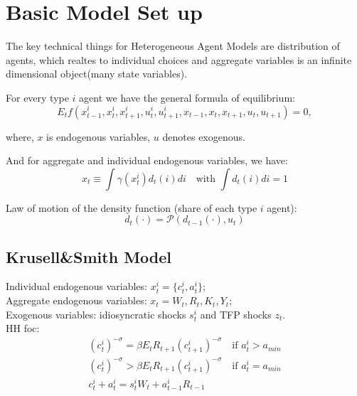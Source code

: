 
% 



\section{Basic Model Set up}

The key technical things for Heterogeneous Agent Models are distribution of agents, which realtes to individual choices and aggregate variables is an {\color{red} infinite dimensional object}(many state variables). 

For every type $i$ agent we have the general formula of equilibrium: 
\[ 
E_t f(x^i_{t-1}, x^i_{t}, x^i_{t+1},u^i_{t},u^i_{t+1},x_{t-1}, x_{t}, x_{t+1},u_{t},u_{t+1})=0, 
\]


where, $x$ is endogenous variables, $u$ denotes exogenous. 

And for aggregate and individual endogenous variables, we have: 
\[
x_t \equiv \int \gamma (x_t^i)d_t (i)di \quad \text{with } \int d_t (i)di = 1 
\]

Law of motion of the density function (share of each type $i$ agent): 
\[ d_t (\cdot) = \mathcal{P}(d_{t-1}(\cdot), u_t)\]

\subsection{Krusell\&Smith Model}

Individual endogenous variables: $x^i_t = \{c^i_t,a^i_t\}$;\\

Aggregate endogenous variables: $x_t = W_t,R_t,K_t,Y_t$;\\

Exogenous variables: idiosyncratic shocks $s^i_t$ and TFP shocks $z_t$.\\

HH foc: 
\begin{align}
(c^i_t)^{-\sigma} = \beta E_t R_{t+1}(c^i_{t+1})^{-\sigma} \quad \text{if } a^i_t > a_{min} \\
(c^i_t)^{-\sigma} > \beta E_t R_{t+1}(c^i_{t+1})^{-\sigma} \quad \text{if } a^i_t = a_{min} \\
c^i_t + a^i_t = s^i_t W_t + a^i_{t-1} R_{t-1}
\end{align}

